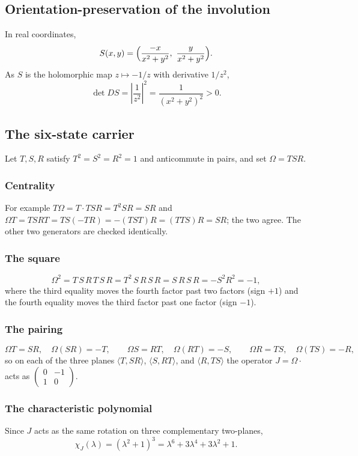 \subsection{Orientation-preservation of the involution}

In real coordinates,
\[
  S(x,y)=\Bigl(\frac{-x}{x^{2}+y^{2}},\ \frac{y}{x^{2}+y^{2}}\Bigr).
\]
As $S$ is the holomorphic map $z\mapsto -1/z$ with derivative $1/z^{2}$,
\[
  \det DS=\left|\frac{1}{z^{2}}\right|^{2}=\frac{1}{(x^{2}+y^{2})^{2}}>0 .
\]

\subsection{The six-state carrier}

Let $T,S,R$ satisfy $T^{2}=S^{2}=R^{2}=1$ and anticommute in pairs, and set
$\Omega=TSR$.

\subsubsection{Centrality}
For example $T\Omega=T\cdot TSR=T^{2}SR=SR$ and
$\Omega T=TSRT=TS(-TR)=-(TST)R=(TTS)R=SR$; the two agree.  The other two generators are
checked identically.

\subsubsection{The square}
\[
  \Omega^{2}=T\,S\,R\,T\,S\,R=T^{2}\,S\,R\,S\,R=S\,R\,S\,R=-S^{2}R^{2}=-1,
\]
where the third equality moves the fourth factor past two factors (sign $+1$) and the
fourth equality moves the third factor past one factor (sign $-1$).

\subsubsection{The pairing}
\[
  \Omega T=SR,\quad \Omega(SR)=-T,\qquad
  \Omega S=RT,\quad \Omega(RT)=-S,\qquad
  \Omega R=TS,\quad \Omega(TS)=-R,
\]
so on each of the three planes $\langle T,SR\rangle$, $\langle S,RT\rangle$, and
$\langle R,TS\rangle$ the operator $J=\Omega\cdot$ acts as
$\begin{pmatrix}0&-1\\ 1&0\end{pmatrix}$.

\subsubsection{The characteristic polynomial}
Since $J$ acts as the same rotation on three complementary two-planes,
\[
  \chi_J(\lambda)=(\lambda^{2}+1)^{3}=\lambda^{6}+3\lambda^{4}+3\lambda^{2}+1 .
\]


